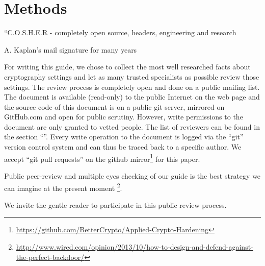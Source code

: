 \section{Methods}
\label{section:Methods}

\epigraph{``C.O.S.H.E.R - completely open source, headers, engineering and research}{A. Kaplan's mail signature for many years}


For writing this guide, we chose to collect the most well researched facts
about cryptography settings and let as many trusted specialists as possible
review those settings.  The review process is completely open and done on a
public mailing list. The document is available (read-only) to the public
Internet on the web page and the source code of this document is on a public
git server, mirrored on GitHub.com and open for public scrutiny.  However,
write permissions to the document are only granted to vetted people.  The list
of reviewers can be found in the section ``''.
Every write operation to the document is logged via the ``git'' version control
system and can thus be traced back to a specific author.  We accept ``git pull
requests'' on the github
mirror\footnote{\url{https://github.com/BetterCrypto/Applied-Crypto-Hardening}}
for this paper.



Public peer-review and multiple eyes checking of our guide is the best
strategy we can imagine at the present moment
\footnote{\url{http://www.wired.com/opinion/2013/10/how-to-design-and-defend-against-the-perfect-backdoor/}}.

We invite the gentle reader to participate in this public review process.

